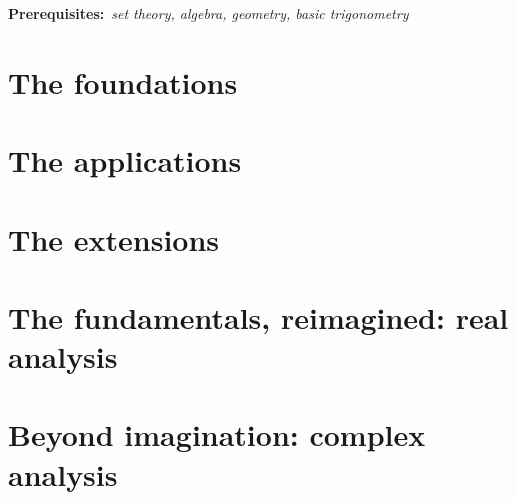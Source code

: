 \documentclass[b5paper, 11pt, openleft]{memoir}
\newcommand{\prerequisites}[1]{\textbf{Prerequisites:}~\emph{#1}}
\begin{document}
\thispagestyle{empty}


\frontmatter

\prerequisites{set theory, algebra, geometry, basic trigonometry}

\tableofcontents





\mainmatter

\part{The foundations}











\part{The applications}






\part{The extensions}





\part{The fundamentals, reimagined: real analysis}



\part{Beyond imagination: complex analysis}



\appendix




\printindex
\printbibliography
\end{document}
